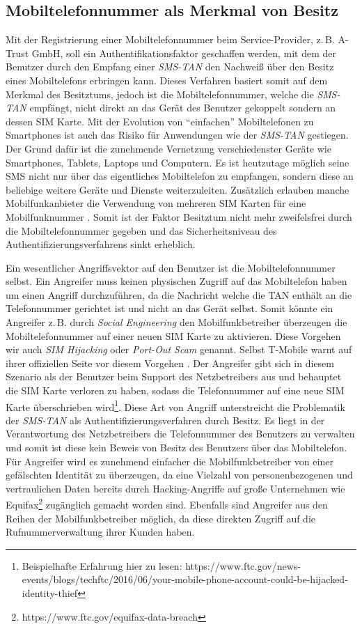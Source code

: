 \documentclass[11pt,a4paper,ngerman]{scrreprt}
\begin{document}
\subsection{Mobiltelefonnummer als Merkmal von Besitz}
Mit der Registrierung einer Mobiltelefonnummer beim Service-Provider, z.\,B. A-Trust GmbH, soll ein Authentifikationsfaktor geschaffen werden, mit dem der Benutzer durch den Empfang einer \textit{SMS-TAN} den Nachweiß über den Besitz eines Mobiltelefons erbringen kann. Dieses Verfahren basiert somit auf dem Merkmal des Besitztums, jedoch ist die Mobiltelefonnummer, welche die \textit{SMS-TAN} empfängt, nicht direkt an das Gerät des Benutzer gekoppelt sondern an dessen SIM Karte. Mit der Evolution von ``einfachen'' Mobiltelefonen zu Smartphones ist auch das Risiko für Anwendungen wie der \textit{SMS-TAN} gestiegen. Der Grund dafür ist die zunehmende Vernetzung verschiedenster Geräte wie Smartphones, Tablets, Laptops und Computern. Es ist heutzutage möglich seine SMS nicht nur über das eigentliches Mobiltelefon zu empfangen, sondern diese an beliebige weitere Geräte und Dienste weiterzuleiten. Zusätzlich erlauben manche Mobilfunkanbieter die Verwendung von mehreren SIM Karten für eine Mobilfunknummer \cite{tmobileMultiSim}. Somit ist der Faktor Besitztum nicht mehr zweifelsfrei durch die Mobiltelefonnummer gegeben und das Sicherheitsniveau des Authentifizierungsverfahrens sinkt erheblich.

Ein wesentlicher Angriffsvektor auf den Benutzer ist die Mobiltelefonnummer selbst. Ein Angreifer muss keinen physischen Zugriff auf das Mobiltelefon haben um einen Angriff durchzuführen, da die Nachricht welche die TAN enthält an die Telefonnummer gerichtet ist und nicht an das Gerät selbst. Somit könnte ein Angreifer z.\,B. durch \emph{Social Engineering} den Mobilfunkbetreiber überzeugen die Mobiltelefonnummer auf einer neuen SIM Karte zu aktivieren. Diese Vorgehen wir auch \emph{SIM Hijacking} oder \emph{Port-Out Scam} genannt. Selbst T-Mobile warnt auf ihrer offiziellen Seite vor diesem Vorgehen \cite{telekomPortOut}. Der Angreifer gibt sich in diesem Szenario als der Benutzer beim Support des Netzbetreibers aus und behauptet die SIM Karte verloren zu haben, sodass die Telefonnummer auf eine neue SIM Karte überschrieben wird\footnote{Beispielhafte Erfahrung hier zu lesen: https://www.ftc.gov/news-events/blogs/techftc/2016/06/your-mobile-phone-account-could-be-hijacked-identity-thief}. Diese Art von Angriff unterstreicht die Problematik der \textit{SMS-TAN} als Authentifizierungsverfahren durch Besitz. Es liegt in der Verantwortung des Netzbetreibers die Telefonnummer des Benutzers zu verwalten und somit ist diese kein Beweis von Besitz des Benutzers über das Mobiltelefon. Für Angreifer wird es zunehmend einfacher die Mobilfunkbetreiber von einer gefälschten Identität zu überzeugen, da eine Vielzahl von personenbezogenen und vertraulichen Daten bereits durch Hacking-Angriffe auf große Unternehmen wie Equifax\footnote{https://www.ftc.gov/equifax-data-breach} zugänglich gemacht worden sind. Ebenfalls sind Angreifer aus den Reihen der Mobilfunkbetreiber möglich, da diese direkten Zugriff auf die Rufnummerverwaltung ihrer Kunden haben.
\end{document}
